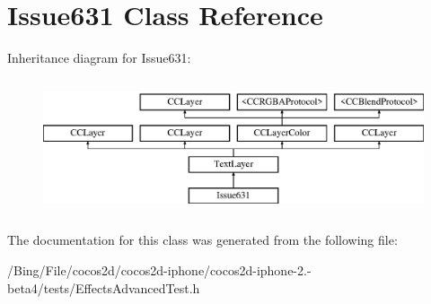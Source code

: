 \hypertarget{interface_issue631}{\section{Issue631 Class Reference}
\label{interface_issue631}
}
Inheritance diagram for Issue631\-:\begin{figure}[H]
\begin{center}
\leavevmode
\includegraphics[height=4.000000cm]{interface_issue631}
\end{center}
\end{figure}


The documentation for this class was generated from the following file\-:\begin{DoxyCompactItemize}
\item 
/\-Bing/\-File/cocos2d/cocos2d-\/iphone/cocos2d-\/iphone-\/2.-\/beta4/tests/Effects\-Advanced\-Test.\-h\end{DoxyCompactItemize}
